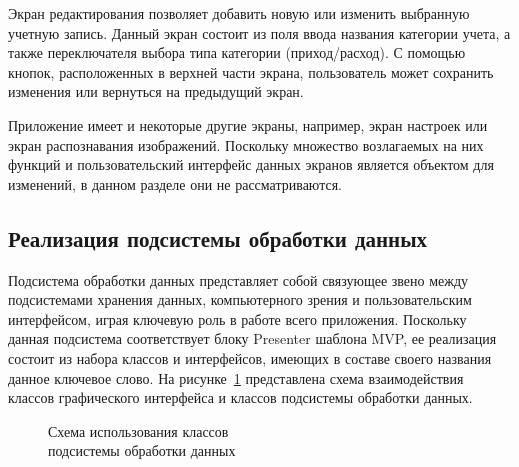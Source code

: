 Экран редактирования позволяет добавить новую или изменить выбранную
учетную запись. Данный экран состоит из поля ввода названия категории учета,
а также переключателя выбора типа категории (приход/расход).
С помощью кнопок, расположенных в верхней части экрана, пользователь
может сохранить изменения или вернуться на предыдущий экран.

Приложение имеет и некоторые другие экраны, например,
экран настроек или экран распознавания изображений.
Поскольку множество возлагаемых на них функций
и пользовательский интерфейс данных экранов является объектом для
изменений, в данном разделе они не рассматриваются.


\subsection{Реализация подсистемы обработки данных}
\label{subsec:implementation_bl}

Подсистема обработки данных представляет собой связующее звено
между подсистемами хранения данных, компьютерного зрения и
пользовательским интерфейсом, играя ключевую роль в работе всего приложения.
Поскольку данная подсистема соответствует блоку Presenter шаблона
MVP, ее реализация состоит из набора классов и интерфейсов,
имеющих в составе своего названия данное ключевое слово.
На рисунке~\ref{fig:implementation_bl_presenter} представлена схема взаимодействия
классов графического интерфейса и классов подсистемы обработки данных.

\begin{figure}[h!]
  \centering
  \caption{Схема использования классов \\ подсистемы обработки данных}
  \label{fig:implementation_bl_presenter}
\end{figure}

